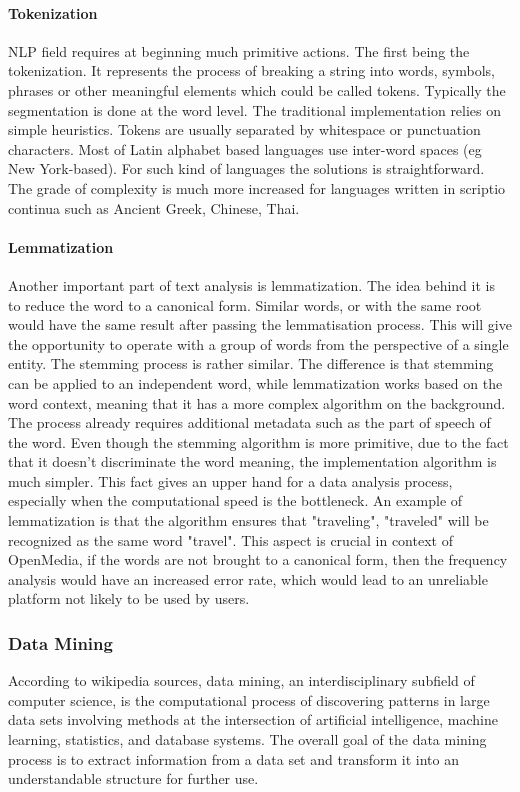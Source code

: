\paragraph{Tokenization}
NLP field requires at beginning much primitive actions. The first being the tokenization. It represents the process of breaking a string into words, symbols, phrases or other meaningful elements which could be called tokens. Typically the segmentation is done at the word level. The traditional implementation relies on simple heuristics. Tokens are usually separated by whitespace or punctuation characters. Most of Latin alphabet based languages use inter-word spaces (eg New York-based). For such kind of languages the solutions is straightforward. The grade of complexity is much more increased for languages written in scriptio continua such as Ancient Greek, Chinese, Thai.

\paragraph{Lemmatization}
Another important part of text analysis is lemmatization. The idea behind it is to reduce the word to a canonical form. Similar words, or with the same root would have the same result after passing the lemmatisation process. This will give the opportunity to operate with a group of words from the perspective of a single entity. The stemming process is rather similar. The difference is that stemming can be applied to an independent word, while lemmatization works based on the word context, meaning that it has a more complex algorithm on the background. The process already requires additional metadata such as the part of speech of the word. Even though the stemming algorithm is more primitive, due to the fact that it doesn't discriminate the word meaning, the implementation algorithm is much simpler. This fact gives an upper hand for a data analysis process, especially when the computational speed is the bottleneck. An example of lemmatization is that the algorithm ensures that "traveling", "traveled" will be recognized as the same word "travel". This aspect is crucial in context of OpenMedia, if the words are not brought to a canonical form, then the frequency analysis would have an increased error rate, which would lead to an unreliable platform not likely to be used by users.

\subsubsection{Data Mining}
According to wikipedia sources, data mining, an interdisciplinary subfield of computer science, is the computational process of discovering patterns in large data sets involving methods at the intersection of artificial intelligence, machine learning, statistics, and database systems. The overall goal of the data mining process is to extract information from a data set and transform it into an understandable structure for further use. \cite{wiki_data_mining}

